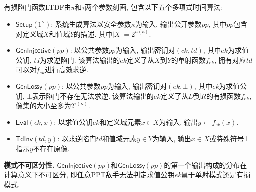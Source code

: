 \begin{definition}[有损陷门函数LTDF]
有损陷门函数LTDF由$n$和$\tau$两个参数刻画, 包含以下五个多项式时间算法: 
\begin{itemize}
\item $\mathsf{Setup}(1^\kappa)$: 系统生成算法以安全参数$\kappa$为输入, 输出公开参数$pp$, 
	其中$pp$包含对定义域$X$和值域$Y$的描述. 其中$|X| = 2^{n(\kappa)}$.  

\item $\mathsf{GenInjective}(pp)$: 以公共参数$pp$为输入, 输出密钥对$(ek, td)$, 其中$ek$为求值公钥, $td$为求逆陷门. 
	该算法输出的$ek$定义了从$X$到$Y$的单射函数$f_{ek}$, 拥有对应$td$可以对$f_{ek}$进行高效求逆.  

\item $\mathsf{GenLossy}(pp)$: 以公共参数$pp$为输入, 输出密钥对$(ek, \bot)$, 
	其中$ek$为求值公钥, $\bot$表示陷门不存在无法求逆. 
	该算法输出的$ek$定义了从$D$到$R$的有损函数$f_{ek}$, 像集的大小至多为$2^{\tau(\kappa)}$.  

\item $\mathsf{Eval}(ek, x)$: 以求值公钥$ek$和定义域元素$x \in X$为输入, 输出$y \leftarrow f_{ek}(x)$.  

\item $\mathsf{TdInv}(td, y)$: 以求逆陷门$td$和值域元素$y \in Y$为输入, 输出$x \in X$或特殊符号$\bot$指示$y$不存在原像.       
\end{itemize}

\begin{trivlist}
\item \textbf{模式不可区分性.} $\mathsf{GenInjective}(pp)$和$\mathsf{GenLossy}(pp)$的第一个输出构成的分布在计算意义下不可区分, 
	即任意PPT敌手无法判定求值公钥$ek$属于单射模式还是有损模式. 
\end{trivlist}
\end{definition}

